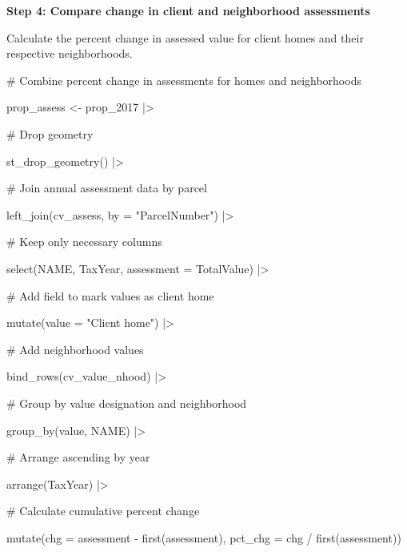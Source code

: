 \documentclass[
  letterpaper,
  DIV=11,
  numbers=noendperiod]{scrartcl}
\newenvironment{Shaded}{\begin{snugshade}}{\end{snugshade}}
\newcommand{\AttributeTok}[1]{\textcolor[rgb]{0.40,0.45,0.13}{#1}}
\newcommand{\CommentTok}[1]{\textcolor[rgb]{0.37,0.37,0.37}{#1}}
\newcommand{\FunctionTok}[1]{\textcolor[rgb]{0.28,0.35,0.67}{#1}}
\newcommand{\NormalTok}[1]{\textcolor[rgb]{0.00,0.23,0.31}{#1}}
\newcommand{\OtherTok}[1]{\textcolor[rgb]{0.00,0.23,0.31}{#1}}
\newcommand{\SpecialCharTok}[1]{\textcolor[rgb]{0.37,0.37,0.37}{#1}}
\newcommand{\StringTok}[1]{\textcolor[rgb]{0.13,0.47,0.30}{#1}}
\begin{document}
\textbf{Step 4: Compare change in client and neighborhood assessments}

Calculate the percent change in assessed value for client homes and
their respective neighborhoods.

\begin{Shaded}
\begin{Highlighting}[]
\CommentTok{\# Combine percent change in assessments for homes and neighborhoods}

\NormalTok{prop\_assess }\OtherTok{\textless{}{-}}\NormalTok{ prop\_2017 }\SpecialCharTok{|\textgreater{}} 
  
  \CommentTok{\# Drop geometry}
  
  \FunctionTok{st\_drop\_geometry}\NormalTok{() }\SpecialCharTok{|\textgreater{}} 
  
  \CommentTok{\# Join annual assessment data by parcel}
  
  \FunctionTok{left\_join}\NormalTok{(cv\_assess, }\AttributeTok{by =} \StringTok{"ParcelNumber"}\NormalTok{) }\SpecialCharTok{|\textgreater{}} 
  
  \CommentTok{\# Keep only necessary columns}
  
  \FunctionTok{select}\NormalTok{(NAME, TaxYear, }\AttributeTok{assessment =}\NormalTok{ TotalValue) }\SpecialCharTok{|\textgreater{}}
  
  \CommentTok{\# Add field to mark values as client home}
  
  \FunctionTok{mutate}\NormalTok{(}\AttributeTok{value =} \StringTok{"Client home"}\NormalTok{) }\SpecialCharTok{|\textgreater{}} 
  
  \CommentTok{\# Add neighborhood values}
  
  \FunctionTok{bind\_rows}\NormalTok{(cv\_value\_nhood) }\SpecialCharTok{|\textgreater{}} 
  
  \CommentTok{\# Group by value designation and neighborhood}
  
  \FunctionTok{group\_by}\NormalTok{(value, NAME) }\SpecialCharTok{|\textgreater{}} 
  
  \CommentTok{\# Arrange ascending by year}
  
  \FunctionTok{arrange}\NormalTok{(TaxYear) }\SpecialCharTok{|\textgreater{}} 
  
  \CommentTok{\# Calculate cumulative percent change}
  
  \FunctionTok{mutate}\NormalTok{(}\AttributeTok{chg =}\NormalTok{ assessment }\SpecialCharTok{{-}} \FunctionTok{first}\NormalTok{(assessment),}
         \AttributeTok{pct\_chg =}\NormalTok{ chg }\SpecialCharTok{/} \FunctionTok{first}\NormalTok{(assessment))}
\end{Highlighting}
\end{Shaded}
\end{document}
